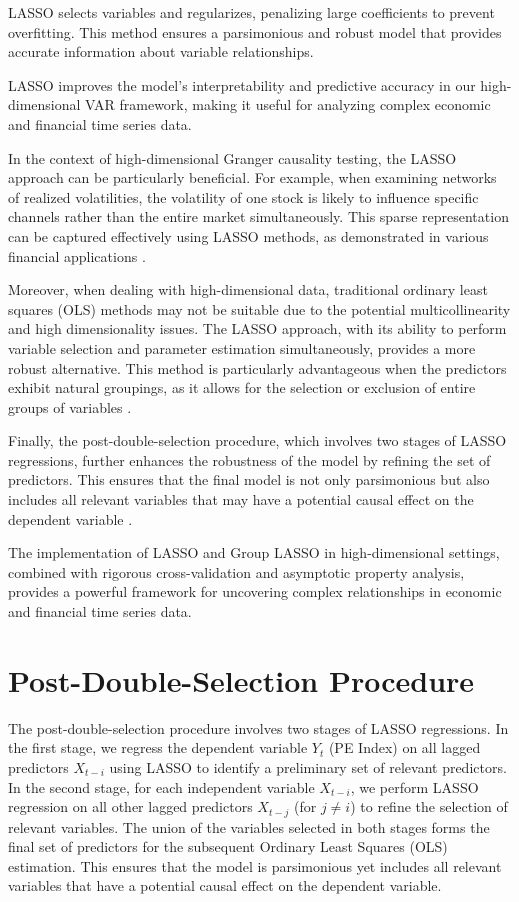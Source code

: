 \documentclass[11pt]{article}
\begin{document}
LASSO selects variables and regularizes, penalizing large coefficients to prevent overfitting. This method ensures a parsimonious and robust model that provides accurate information about variable relationships.

LASSO improves the model's interpretability and predictive accuracy in our high-dimensional VAR framework, making it useful for analyzing complex economic and financial time series data.

In the context of high-dimensional Granger causality testing, the LASSO approach can be particularly beneficial. For example, when examining networks of realized volatilities, the volatility of one stock is likely to influence specific channels rather than the entire market simultaneously. This sparse representation can be captured effectively using LASSO methods, as demonstrated in various financial applications  .

Moreover, when dealing with high-dimensional data, traditional ordinary least squares (OLS) methods may not be suitable due to the potential multicollinearity and high dimensionality issues. The LASSO approach, with its ability to perform variable selection and parameter estimation simultaneously, provides a more robust alternative. This method is particularly advantageous when the predictors exhibit natural groupings, as it allows for the selection or exclusion of entire groups of variables  .

Finally, the post-double-selection procedure, which involves two stages of LASSO regressions, further enhances the robustness of the model by refining the set of predictors. This ensures that the final model is not only parsimonious but also includes all relevant variables that may have a potential causal effect on the dependent variable  .

The implementation of LASSO and Group LASSO in high-dimensional settings, combined with rigorous cross-validation and asymptotic property analysis, provides a powerful framework for uncovering complex relationships in economic and financial time series data.


\section{Post-Double-Selection Procedure}


The post-double-selection procedure involves two stages of LASSO regressions. In the first stage, we regress the dependent variable \(Y_t\) (PE Index) on all lagged predictors \(X_{t-i}\) using LASSO to identify a preliminary set of relevant predictors. In the second stage, for each independent variable \(X_{t-i}\), we perform LASSO regression on all other lagged predictors \(X_{t-j}\) (for \(j \neq i\)) to refine the selection of relevant variables. The union of the variables selected in both stages forms the final set of predictors for the subsequent Ordinary Least Squares (OLS) estimation. This ensures that the model is parsimonious yet includes all relevant variables that have a potential causal effect on the dependent variable.
\end{document}
